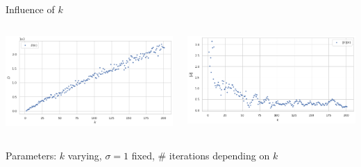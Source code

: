 \documentclass{beamer}
\begin{document}
\begin{frame}{Influence of $k$}
	\begin{minipage}[0.95\textheight]{\textwidth}
	\begin{columns}[T]
	\begin{column}{0.50\textwidth}
	\includegraphics[width=\textwidth, keepaspectratio]{../images/D_N.png}
	\end{column}
	\begin{column}{0.50\textwidth}
	\includegraphics[width=\textwidth, keepaspectratio]{../images/v_N.png}
	\end{column}
	\end{columns}
	\end{minipage}
	\begin{center}
		Parameters: $k$ varying, $\sigma=1$ fixed, \# iterations depending on $k$
	\end{center}
\end{frame}
\end{document}
